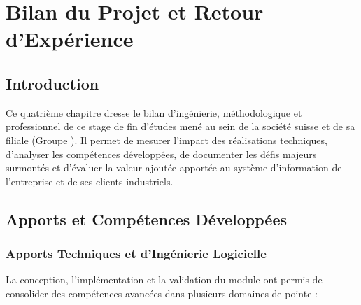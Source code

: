 \chapter{Bilan du Projet et Retour d'Expérience}
\label{chap:bilan}

\section{Introduction}
Ce quatrième chapitre dresse le bilan d'ingénierie, méthodologique et professionnel de ce stage de fin d'études mené au sein de la société suisse \textbf{\companyName} et de sa filiale \textbf{\companySubsidiary} (Groupe \companyGroup). Il permet de mesurer l'impact des réalisations techniques, d'analyser les compétences développées, de documenter les défis majeurs surmontés et d'évaluer la valeur ajoutée apportée au système d'information de l'entreprise et de ses clients industriels.

\section{Apports et Compétences Développées}

\subsection{Apports Techniques et d'Ingénierie Logicielle}
La conception, l'implémentation et la validation du module \textbf{\odooModule} ont permis de consolider des compétences avancées dans plusieurs domaines de pointe :

